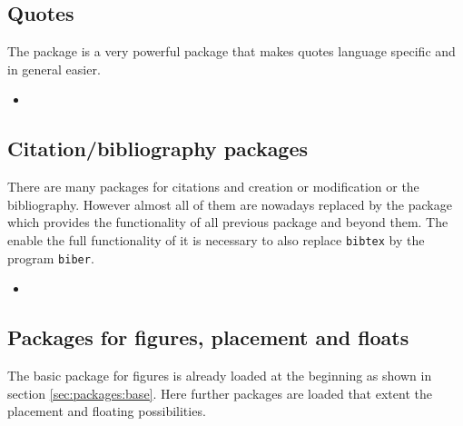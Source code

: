 
\subsection{Quotes}
\label{sec:packages:quotes}

The package  is a very powerful package that makes quotes language specific and in general easier.

\begin{itemize}[noitemsep]
\item {}
\end{itemize}


\subsection{Citation/bibliography packages}
\label{sec:packages:bibliography}
There are many packages for citations and creation or modification or the bibliography. However almost all of them are nowadays replaced by the package 
 which provides the functionality of all previous package and beyond them. The enable the full functionality of  it is necessary to also replace \texttt{bibtex} by the program \texttt{biber}.

\begin{itemize}[noitemsep]
\item {}
\end{itemize}


\subsection{Packages for figures, placement and floats}
\label{sec:packages:figures}

The basic package  for figures is already loaded at the beginning as shown in section \ref{sec:packages:base}. Here further packages are loaded that extent the placement and floating possibilities.

